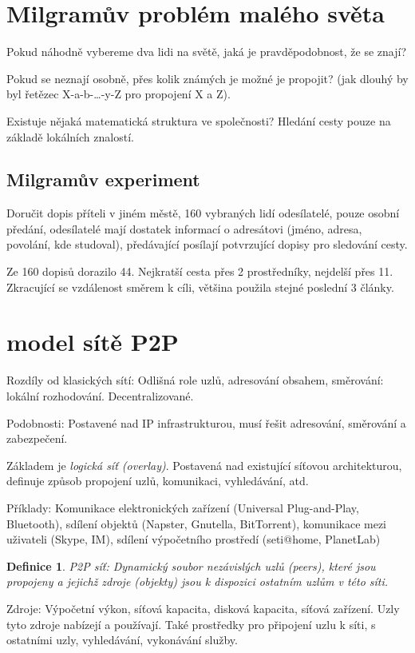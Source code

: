 \documentclass[a4paper, 11pt]{report}
\newtheorem{mydef}{Definice}[chapter]
\begin{document}
\section{Milgramův problém malého světa}
Pokud náhodně vybereme dva lidi na světě, jaká je pravděpodobnost, že se znají?

Pokud se neznají osobně, přes kolik známých je možné je propojit? (jak dlouhý by byl řetězec X-a-b-\dots-y-Z pro propojení X a Z).

Existuje nějaká matematická struktura ve společnosti? Hledání cesty pouze na základě lokálních znalostí.

\subsection{Milgramův experiment}
Doručit dopis příteli v jiném městě, 160 vybraných lidí odesílatelé, pouze osobní předání, odesílatelé mají dostatek informací o adresátovi (jméno, adresa, povolání, kde studoval), předávající posílají potvrzující dopisy pro sledování cesty.

Ze 160 dopisů dorazilo 44. Nejkratší cesta přes 2 prostředníky, nejdelší přes 11. Zkracující se vzdálenost směrem k cíli, většina použila stejné poslední 3 články.

\section{model sítě P2P}

Rozdíly od klasických sítí: Odlišná role uzlů, adresování obsahem, směrování: lokální rozhodování. Decentralizované.

Podobnosti: Postavené nad IP infrastrukturou, musí řešit adresování, směrování a zabezpečení.

Základem je \emph{logická síť (overlay)}. Postavená nad existující síťovou architekturou, definuje způsob propojení uzlů, komunikaci, vyhledávání, atd.

Příklady: Komunikace elektronických zařízení (Universal Plug-and-Play, Bluetooth), sdílení objektů (Napster, Gnutella, BitTorrent), komunikace mezi uživateli (Skype, IM), sdílení výpočetního prostředí (seti@home, PlanetLab)

\begin{mydef}
P2P síť: Dynamický soubor nezávislých uzlů (peers), které jsou propojeny a jejichž zdroje (objekty) jsou k dispozici ostatním uzlům v této síti.
\end{mydef}
Zdroje: Výpočetní výkon, síťová kapacita, disková kapacita, síťová zařízení. Uzly tyto zdroje nabízejí a používají. Také prostředky pro připojení uzlu k síti, s ostatními uzly, vyhledávání, vykonávání služby.
\end{document}
